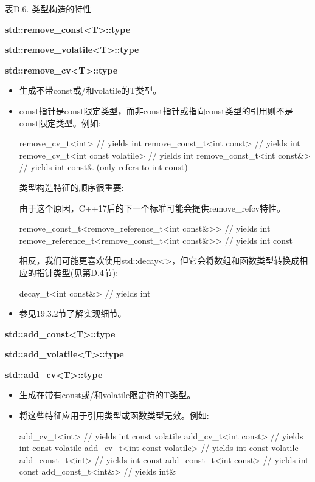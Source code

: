 \begin{center}
表D.6. 类型构造的特性
\end{center}

\textbf{std::remove\_const<T>::type}

\textbf{std::remove\_volatile<T>::type}

\textbf{std::remove\_cv<T>::type}

\begin{itemize}
\item
生成不带const或/和volatile的T类型。

\item
const指针是const限定类型，而非const指针或指向const类型的引用则不是const限定类型。例如:

\begin{cpp}
remove_cv_t<int> // yields int
remove_const_t<int const> // yields int
remove_cv_t<int const volatile> // yields int
remove_const_t<int const&> // yields int const& (only refers to int const)
\end{cpp}

类型构造特征的顺序很重要:

\begin{notice}由于这个原因，C++17后的下一个标准可能会提供remove\_refcv特性。
\end{notice}

\begin{cpp}
remove_const_t<remove_reference_t<int const&>> // yields int
remove_reference_t<remove_const_t<int const&>> // yields int const
\end{cpp}

相反，我们可能更喜欢使用std::decay<>，但它会将数组和函数类型转换成相应的指针类型(见第D.4节):

\begin{cpp}
decay_t<int const&> // yields int
\end{cpp}

\item
参见19.3.2节了解实现细节。
\end{itemize}

\textbf{std::add\_const<T>::type}

\textbf{std::add\_volatile<T>::type}

\textbf{std::add\_cv<T>::type}

\begin{itemize}
\item
生成在带有const或/和volatile限定符的T类型。

\item
将这些特征应用于引用类型或函数类型无效。例如:
\begin{cpp}
add_cv_t<int> // yields int const volatile
add_cv_t<int const> // yields int const volatile
add_cv_t<int const volatile> // yields int const volatile
add_const_t<int> // yields int const
add_const_t<int const> // yields int const
add_const_t<int&> // yields int&
\end{cpp}
\end{itemize}

